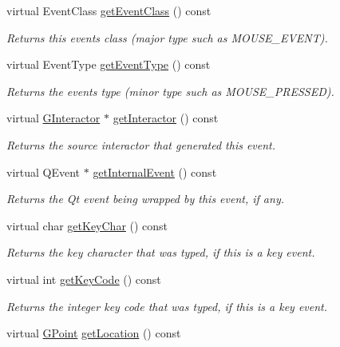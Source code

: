 \begin{DoxyCompactItemize}
virtual Event\+Class \mbox{\hyperlink{classGEvent_a84e9319971c682404ea8f030cfee38f9}{get\+Event\+Class}} () const
\begin{DoxyCompactList}\small\item\em Returns this event\textquotesingle{}s class (major type such as M\+O\+U\+S\+E\+\_\+\+E\+V\+E\+NT). \end{DoxyCompactList}\item 
virtual Event\+Type \mbox{\hyperlink{classGEvent_a404fe4b126a8443600109a62ef7ce6a2}{get\+Event\+Type}} () const
\begin{DoxyCompactList}\small\item\em Returns the event\textquotesingle{}s type (minor type such as M\+O\+U\+S\+E\+\_\+\+P\+R\+E\+S\+S\+ED). \end{DoxyCompactList}\item 
virtual \mbox{\hyperlink{classGInteractor}{G\+Interactor}} $\ast$ \mbox{\hyperlink{classGEvent_ac8998a7ac699a98fbdc125ef0f3d64f1}{get\+Interactor}} () const
\begin{DoxyCompactList}\small\item\em Returns the source interactor that generated this event. \end{DoxyCompactList}\item 
virtual Q\+Event $\ast$ \mbox{\hyperlink{classGEvent_ab3589ee7d7005f6a323ff2c968f82038}{get\+Internal\+Event}} () const
\begin{DoxyCompactList}\small\item\em Returns the Qt event being wrapped by this event, if any. \end{DoxyCompactList}\item 
virtual char \mbox{\hyperlink{classGEvent_ab23396e09d92df320d2324b47a0766e8}{get\+Key\+Char}} () const
\begin{DoxyCompactList}\small\item\em Returns the key character that was typed, if this is a key event. \end{DoxyCompactList}\item 
virtual int \mbox{\hyperlink{classGEvent_a71429f4b3c8f3c5097fe39e50501bbb6}{get\+Key\+Code}} () const
\begin{DoxyCompactList}\small\item\em Returns the integer key code that was typed, if this is a key event. \end{DoxyCompactList}\item 
virtual \mbox{\hyperlink{classGPoint}{G\+Point}} \mbox{\hyperlink{classGEvent_a4f83802015511edeb63b892830812c11}{get\+Location}} () const

\end{DoxyCompactItemize}
